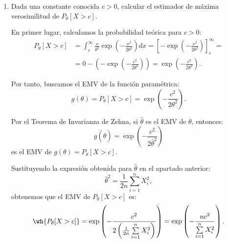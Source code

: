 \begin{ejercicio}
\begin{enumerate}[label=\alph*)]
        Como $\theta > 0$ y $\widehat{\theta} > 0$, podemos concluir que efectivamente $\widehat{\theta}$ es un estimador de $\theta$, y por lo tanto, $\widehat{\theta}$ es el EMV de $\theta$.
        \item Dada una constante conocida $c > 0$, calcular el estimador de máxima verosimilitud de $P_\theta[X > c]$.
        
        En primer lugar, calculamos la probabilidad teórica para $c > 0$:
        \begin{align*}
            P_\theta[X > c] &= \int_{c}^{\infty} \frac{x}{\theta^2} \exp\left(-\frac{x^2}{2\theta^2}\right) dx = \left[ -\exp\left(-\frac{x^2}{2\theta^2}\right) \right]_{c}^{\infty} = \\
            &= 0 - \left(-\exp\left(-\frac{c^2}{2\theta^2}\right)\right) = \exp\left(-\frac{c^2}{2\theta^2}\right).
        \end{align*}

        Por tanto, buscamos el EMV de la función paramétrica:
        \begin{equation*}
            g(\theta) = P_\theta[X > c] = \exp\left(-\frac{c^2}{2\theta^2}\right).
        \end{equation*}

        Por el Teorema de Invarianza de Zehna, si $\widehat{\theta}$ es el EMV de $\theta$, entonces:
        \begin{equation*}
            g(\widehat{\theta}) = \exp\left(-\frac{c^2}{2\widehat{\theta}^2}\right)
        \end{equation*}
        es el EMV de $g(\theta) = P_\theta[X > c]$.

        Sustituyendo la expresión obtenida para $\widehat{\theta}$ en el apartado anterior:
        \begin{equation*}
            \widehat{\theta}^2 = \frac{1}{2n}\sum_{i=1}^{n} X_i^2,
        \end{equation*}
        obtenemos que el EMV de $P_\theta[X > c]$ es:
        \begin{equation*}
            \wh{P_\theta[X > c]} = \exp\left(-\frac{c^2}{2\left(\frac{1}{2n}\sum\limits_{i=1}^{n} X_i^2\right)}\right) = \exp\left(-\frac{n c^2}{\sum\limits_{i=1}^{n} X_i^2}\right).
        \end{equation*}
    \end{enumerate}

\end{ejercicio}


